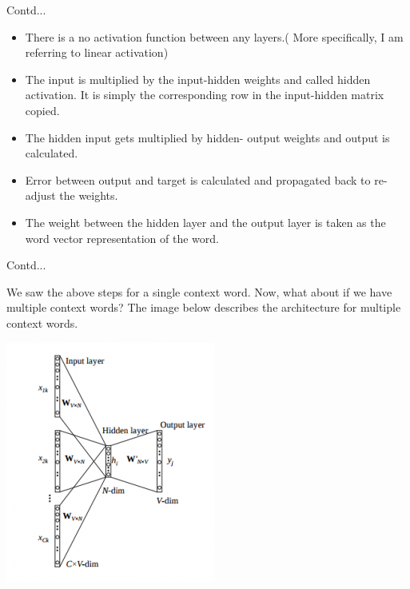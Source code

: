 \documentclass{beamer}
\begin{document}
\begin{frame}{Contd...}
\begin{flushleft}
\begin{itemize}
	\item There is a no activation function between any layers.( More specifically, I am referring to linear activation)
	\item The input is multiplied by the input-hidden weights and called hidden activation. It is simply the corresponding row in the input-hidden matrix copied.
	\item The hidden input gets multiplied by hidden- output weights and output is calculated.
	\item Error between output and target is calculated and propagated back to re-adjust the weights.
	\item The weight  between the hidden layer and the output layer is taken as the word vector representation of the word.
\end{itemize}
	\end{flushleft}
\end{frame}
\begin{frame}{Contd...}
\begin{flushleft}
We saw the above steps for a single context word. Now, what about if we have multiple context words? The image below describes the architecture for multiple context words.

\includegraphics[scale=0.6]{cbow2}
\end{flushleft}
\end{frame}
\end{document}
